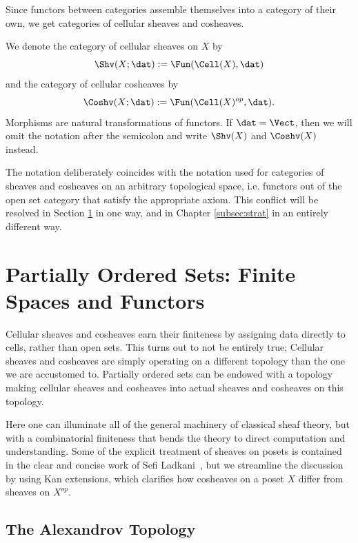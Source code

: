 Since functors between categories assemble themselves into a category of their own, we get categories of cellular sheaves and cosheaves.
\begin{defn}\label{defn:cat_cell_sheaves}
 We denote the category of cellular sheaves on $X$ by
\[
 \Shv(X;\dat):=\Fun(\Cell(X),\dat)
\]
and the category of cellular cosheaves by
\[
 \Coshv(X;\dat):=\Fun(\Cell(X)^{op},\dat).
\]
Morphisms are natural transformations of functors. If $\dat=\Vect$, then we will omit the notation after the semicolon and write $\Shv(X)$ and $\Coshv(X)$ instead.
\end{defn}

The notation deliberately coincides with the notation used for categories of sheaves and cosheaves on an arbitrary topological space, i.e. functors out of the open set category that satisfy the appropriate axiom. This conflict will be resolved in Section \ref{subsec:posets} in one way, and in Chapter \ref{subsec:strat} in an entirely different way.

\section{Partially Ordered Sets: Finite Spaces and Functors}
\label{subsec:posets}

Cellular sheaves and cosheaves earn their finiteness by assigning data directly to cells, rather than open sets. This turns out to not be entirely true; Cellular sheaves and cosheaves are simply operating on a different topology than the one we are accustomed to. Partially ordered sets can be endowed with a topology making cellular sheaves and cosheaves into actual sheaves and cosheaves on this topology.  

Here one can illuminate all of the general machinery of classical sheaf theory, but with a combinatorial finiteness that bends the theory to direct computation and understanding. Some of the explicit treatment of sheaves on posets is contained in the clear and concise work of Sefi Ladkani~\cite{sl-dereq}, but we streamline the discussion by using Kan extensions, which clarifies how cosheaves on a poset $X$ differ from sheaves on $X^{op}$.

\subsection{The Alexandrov Topology}
\label{subsubsec:alex}

